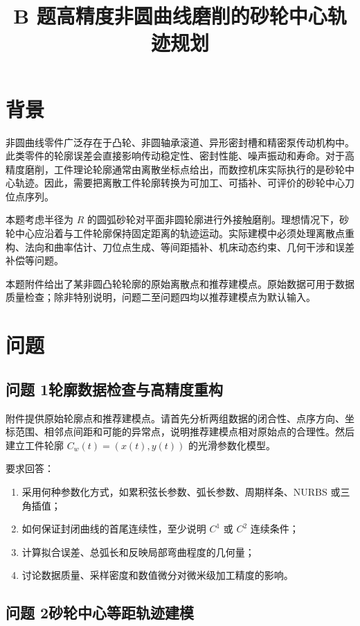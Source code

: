\documentclass[UTF8,a4paper,11pt]{ctexart}
\title{B 题\quad 高精度非圆曲线磨削的砂轮中心轨迹规划}
\author{}
\date{}
\begin{document}
\maketitle

\section*{背景}

非圆曲线零件广泛存在于凸轮、非圆轴承滚道、异形密封槽和精密泵传动机构中。此类零件的轮廓误差会直接影响传动稳定性、密封性能、噪声振动和寿命。对于高精度磨削，工件理论轮廓通常由离散坐标点给出，而数控机床实际执行的是砂轮中心轨迹。因此，需要把离散工件轮廓转换为可加工、可插补、可评价的砂轮中心刀位点序列。

本题考虑半径为 $R$ 的圆弧砂轮对平面非圆轮廓进行外接触磨削。理想情况下，砂轮中心应沿着与工件轮廓保持固定距离的轨迹运动。实际建模中必须处理离散点重构、法向和曲率估计、刀位点生成、等间距插补、机床动态约束、几何干涉和误差补偿等问题。

本题附件给出了某非圆凸轮轮廓的原始离散点和推荐建模点。原始数据可用于数据质量检查；除非特别说明，问题二至问题四均以推荐建模点为默认输入。

\section*{问题}

\subsection*{问题 1\quad 轮廓数据检查与高精度重构}

附件提供原始轮廓点和推荐建模点。请首先分析两组数据的闭合性、点序方向、坐标范围、相邻点间距和可能的异常点，说明推荐建模点相对原始点的合理性。然后建立工件轮廓 $C_w(t)=(x(t),y(t))$ 的光滑参数化模型。

要求回答：
\begin{enumerate}
  \item 采用何种参数化方式，如累积弦长参数、弧长参数、周期样条、NURBS 或三角插值；
  \item 如何保证封闭曲线的首尾连续性，至少说明 $C^1$ 或 $C^2$ 连续条件；
  \item 计算拟合误差、总弧长和反映局部弯曲程度的几何量；
  \item 讨论数据质量、采样密度和数值微分对微米级加工精度的影响。
\end{enumerate}

\subsection*{问题 2\quad 砂轮中心等距轨迹建模}
\end{document}
